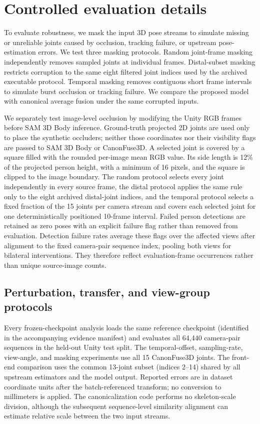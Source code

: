 \documentclass[11pt,letterpaper]{article}
\begin{document}
\section{Controlled evaluation details}
\label{sec:controlled_details}
To evaluate robustness, we mask the input 3D pose streams to simulate missing or unreliable joints caused by occlusion, tracking failure, or upstream pose-estimation errors. We test three masking protocols. Random joint-frame masking independently removes sampled joints at individual frames. Distal-subset masking restricts corruption to the same eight filtered joint indices used by the archived executable protocol. Temporal masking removes contiguous short frame intervals to simulate burst occlusion or tracking failure. We compare the proposed model with canonical average fusion under the same corrupted inputs.

We separately test image-level occlusion by modifying the Unity RGB frames before SAM 3D Body inference. Ground-truth projected 2D joints are used only to place the synthetic occluders; neither those coordinates nor their visibility flags are passed to SAM 3D Body or CanonFuse3D. A selected joint is covered by a square filled with the rounded per-image mean RGB value. Its side length is 12\% of the projected person height, with a minimum of 16 pixels, and the square is clipped to the image boundary. The random protocol selects every joint independently in every source frame, the distal protocol applies the same rule only to the eight archived distal-joint indices, and the temporal protocol selects a fixed fraction of the 15 joints per camera stream and covers each selected joint for one deterministically positioned 10-frame interval. Failed person detections are retained as zero poses with an explicit failure flag rather than removed from evaluation. Detection failure rates average these flags over the affected views after alignment to the fixed camera-pair sequence index, pooling both views for bilateral interventions. They therefore reflect evaluation-frame occurrences rather than unique source-image counts.

\subsection{Perturbation, transfer, and view-group protocols}


Every frozen-checkpoint analysis loads the same reference checkpoint (identified in the accompanying evidence manifest) and evaluates all 64,440 camera-pair sequences in the held-out Unity test split. The temporal-offset, sampling-rate, view-angle, and masking experiments use all 15 CanonFuse3D joints. The front-end comparison uses the common 13-joint subset (indices 2--14) shared by all upstream estimators and the model output. Reported errors are in dataset coordinate units after the batch-referenced transform; no conversion to millimeters is applied. The canonicalization code performs no skeleton-scale division, although the subsequent sequence-level similarity alignment can estimate relative scale between the two input streams.
\end{document}
